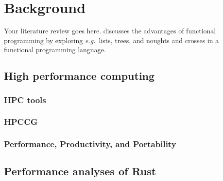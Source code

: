 \chapter{Background}
\label{ch:background}

Your literature review goes here. \cite{hughes1989functional} discusses the advantages of functional programming by exploring \emph{e.g.}\ lists, trees, and noughts and crosses in a functional programming language. 


\section{High performance computing}
\label{sec:hpc} %


\subsection{HPC tools}
\label{ssec:hpc-tools} %


\subsection{HPCCG}
\label{ssec:hpccg} %


\subsection{Performance, Productivity, and Portability}
\label{ssec:p3hpc} %


\section{Performance analyses of Rust} %
\label{sec:related-work-rust-performance}
